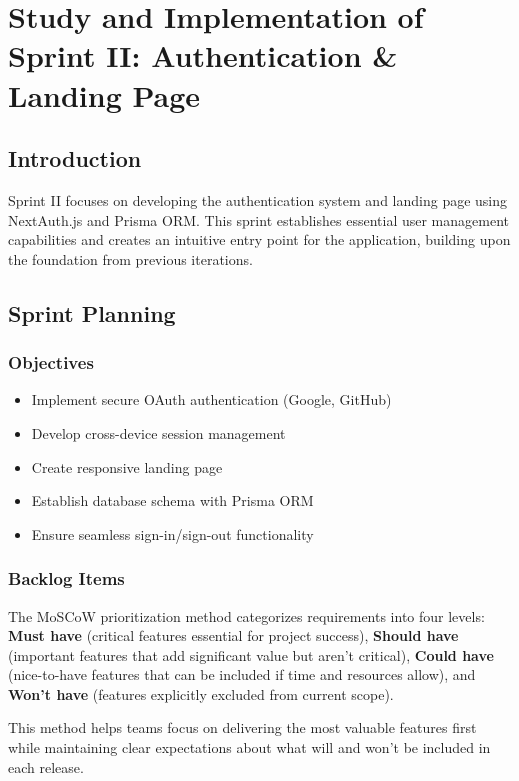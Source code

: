 \chapter[Sprint II]{Study and Implementation of Sprint II: Authentication \& Landing Page}

\section{Introduction}
Sprint II focuses on developing the authentication system and landing page using NextAuth.js and Prisma ORM. This sprint establishes essential user management capabilities and creates an intuitive entry point for the application, building upon the foundation from previous iterations.

\section{Sprint Planning}

\subsection{Objectives}
\begin{itemize}
    \item Implement secure OAuth authentication (Google, GitHub)
    \item Develop cross-device session management
    \item Create responsive landing page
    \item Establish database schema with Prisma ORM
    \item Ensure seamless sign-in/sign-out functionality
\end{itemize}
\subsection{Backlog Items}

The MoSCoW prioritization method categorizes requirements into four levels: \textbf{Must have} (critical features essential for project success), \textbf{Should have} (important features that add significant value but aren't critical), \textbf{Could have} (nice-to-have features that can be included if time and resources allow), and \textbf{Won't have} (features explicitly excluded from current scope).

This method helps teams focus on delivering the most valuable features first while maintaining clear expectations about what will and won't be included in each release.

